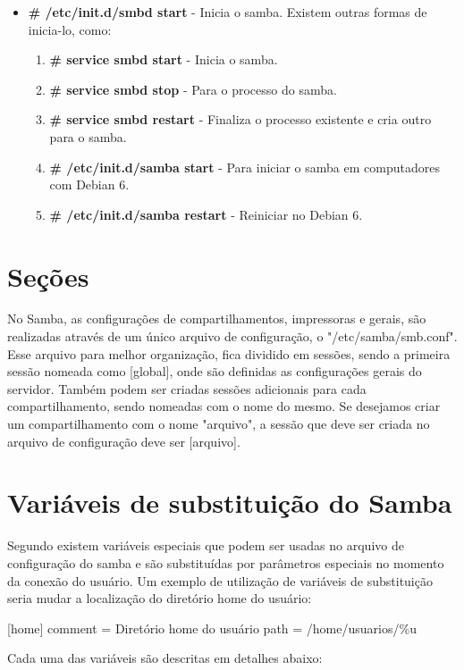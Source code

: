 \begin{itemize}
	\item \textbf{\# /etc/init.d/smbd start} - Inicia o samba. Existem outras formas de inicia-lo, como:
		\begin{enumerate}
			\item \textbf{\# service smbd start} - Inicia o samba.
			\item \textbf{\# service smbd stop} - Para o processo do samba.
			\item \textbf{\# service smbd restart} - Finaliza o processo existente e cria outro para o samba.
			\item \textbf{\# /etc/init.d/samba start} - Para iniciar o samba em computadores com Debian 6.
			\item \textbf{\# /etc/init.d/samba restart} - Reiniciar no Debian 6.
		\end{enumerate}
\end{itemize}

\section{Seções}

No Samba, as configurações de compartilhamentos, impressoras e gerais, são realizadas através de um único arquivo de configuração, o "/etc/samba/smb.conf". Esse arquivo para melhor organização, fica dividido em sessões, sendo a primeira sessão nomeada como [global], onde são definidas as configurações gerais do servidor. Também podem ser criadas sessões adicionais para cada compartilhamento, sendo nomeadas com o nome do mesmo. Se desejamos criar um compartilhamento com o nome "arquivo", a sessão que deve ser criada no arquivo de configuração deve ser [arquivo].

\section{Variáveis de substituição do Samba}

Segundo \cite{FOCA}  existem variáveis especiais que podem ser usadas no arquivo de configuração do samba e são substituídas por parâmetros especiais no momento da conexão do usuário. Um exemplo de utilização de variáveis de substituição seria mudar a localização do diretório home do usuário:

     [home]
      comment = Diretório home do usuário
      path = /home/usuarios/\%u

Cada uma das variáveis são descritas em detalhes abaixo:


